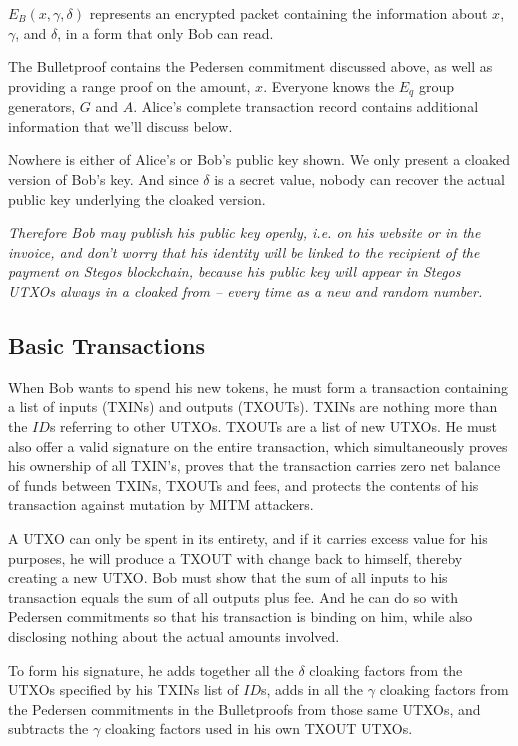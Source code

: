 \documentclass[a4paper, 10pt, conference]{ieeeconf}
\begin{document}
$E_B(x, \gamma, \delta)$ represents an encrypted packet containing the information about $x$, $\gamma$, and $\delta$, in a form that only Bob can read.

The Bulletproof contains the Pedersen commitment discussed above, as well as providing a range proof on the amount, $x$. Everyone knows the $E_q$ group generators, $G$ and $A$. Alice's complete transaction record contains additional information that we'll discuss below.

Nowhere is either of Alice's or Bob's public key shown. We only present a cloaked version of Bob's key. And since $\delta$ is a secret value, nobody can recover the actual public key underlying the cloaked version. 

\textit{Therefore Bob may publish his public key openly, i.e. on his website or in the invoice, and don't worry that his identity will be linked to the recipient of the payment on Stegos blockchain, because his public key will appear in Stegos UTXOs always in a cloaked from -- every time as a new and random number.}

\subsection{Basic Transactions}

When Bob wants to spend his new tokens, he must form a transaction containing a list of inputs (TXINs) and outputs (TXOUTs). TXINs are nothing more than the $\mathit{ID}$s referring to other UTXOs. TXOUTs are a list of new UTXOs. He must also offer a valid signature on the entire transaction, which simultaneously proves his ownership of all TXIN's, proves that the transaction carries zero net balance of funds between TXINs, TXOUTs and fees, and protects the contents of his transaction against mutation by MITM attackers.

A UTXO can only be spent in its entirety, and if it carries excess value for his purposes, he will produce a TXOUT with change back to himself, thereby creating a new UTXO. Bob must show that the sum of all inputs to his transaction equals the sum of all outputs plus fee. And he can do so with Pedersen commitments so that his transaction is binding on him, while also disclosing nothing about the actual amounts involved.

To form his signature, he adds together all the $\delta$ cloaking factors from the UTXOs specified by his TXINs list of $\mathit{ID}$s, adds in all the $\gamma$ cloaking factors from the Pedersen commitments in the Bulletproofs from those same UTXOs, and subtracts the $\gamma$ cloaking factors used in his own TXOUT UTXOs. 
\end{document}
